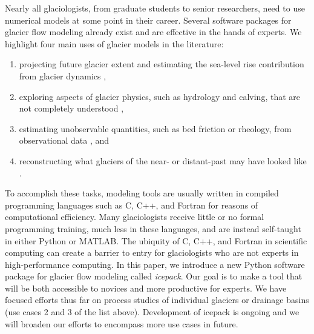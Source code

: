 \documentclass[journal abbreviation, manuscript]{copernicus}
\begin{document}
Nearly all glaciologists, from graduate students to senior researchers, need to use numerical models at some point in their career.
Several software packages for glacier flow modeling already exist and are effective in the hands of experts.
We highlight four main uses of glacier models in the literature:
\begin{enumerate}
    \item projecting future glacier extent and estimating the sea-level rise contribution from glacier dynamics \citep{joughin2014marine},
    \item exploring aspects of glacier physics, such as hydrology and calving, that are not completely understood \citep{nick2010physically, werder2013modeling},
    \item estimating unobservable quantities, such as bed friction or rheology, from observational data \citep{vieli2007causes, shapero2016basal}, and
    \item reconstructing what glaciers of the near- or distant-past may have looked like \citep{huybrechts2002sea}.
\end{enumerate}
To accomplish these tasks, modeling tools are usually written in compiled programming languages such as C, C++, and Fortran for reasons of computational efficiency.
Many glaciologists receive little or no formal programming training, much less in these languages, and are instead self-taught in either Python or MATLAB.
The ubiquity of C, C++, and Fortran in scientific computing can create a barrier to entry for glaciologists who are not experts in high-performance computing.
In this paper, we introduce a new Python software package for glacier flow modeling called \emph{icepack}.
Our goal is to make a tool that will be both accessible to novices and more productive for experts.
We have focused efforts thus far on process studies of individual glaciers or drainage basins (use cases 2 and 3 of the list above).
Development of icepack is ongoing and we will broaden our efforts to encompass more use cases in future.
\end{document}
